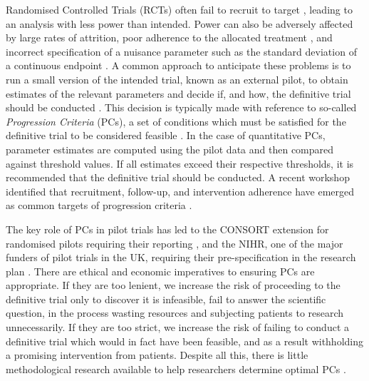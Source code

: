 \documentclass{article}
\begin{document}
Randomised Controlled Trials (RCTs) often fail to recruit to target \cite{Sully2013}, leading to an analysis with less power than intended. Power can also be adversely affected by large rates of attrition, poor adherence to the allocated treatment \cite{Fay2006}, and incorrect specification of a nuisance parameter such as the standard deviation of a continuous endpoint \cite{Teare2014}. A common approach to anticipate these problems is to run a small version of the intended trial, known as an external pilot, to obtain estimates of the relevant parameters and decide if, and how, the definitive trial should be conducted  \cite{Craig2008, Eldridge2016}. This decision is typically made with reference to so-called \emph{Progression Criteria} (PCs), a set of conditions which must be satisfied for the definitive trial to be considered feasible \cite{Avery2017}. In the case of quantitative PCs, parameter estimates are computed using the pilot data and then compared against threshold values. If all estimates exceed their respective thresholds, it is recommended that the definitive trial should be conducted. A recent workshop identified that recruitment, follow-up, and intervention adherence have emerged as common targets of progression criteria \cite{Avery2017}. 

The key role of PCs in pilot trials has led to the CONSORT extension for randomised pilots requiring their reporting \cite{Eldridge2016a}, and the NIHR, one of the major funders of pilot trials in the UK, requiring their pre-specification in the research plan \cite{NIHR2017}. There are ethical and economic imperatives to ensuring PCs are appropriate. If they are too lenient, we increase the risk of proceeding to the definitive trial only to discover it is infeasible, fail to answer the scientific question, in the process wasting resources and subjecting patients to research unnecessarily. If they are too strict, we increase the risk of failing to conduct a definitive trial which would in fact have been feasible, and as a result withholding a promising intervention from patients. Despite all this, there is little methodological research available to help researchers determine optimal PCs \cite{Avery2017}. 

\end{document}
